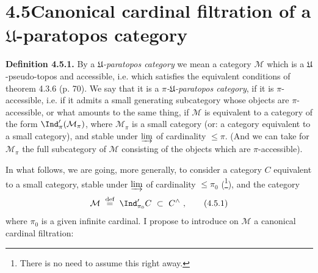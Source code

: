 \setcounter{footnote}{29}


\section*{4.5\quad Canonical cardinal filtration of a $\mathfrak{U}$-paratopos category}

\textbf{Definition 4.5.1.} By a \textit{$\mathfrak{U}$-paratopos category} we mean a category $\mathcal{M}$ which is a $\mathfrak{U}$-pseudo-topos and accessible, i.e. which satisfies the equivalent conditions of theorem 4.3.6 (p. 70). We say that it is a \textit{$\pi$-$\mathfrak{U}$-paratopos category}, if it is $\pi$-accessible, i.e. if it admits a small generating subcategory whose objects are $\pi$-accessible, or what amounts to the same thing, if %
$\mathcal{M}$ is equivalent to a category of the form $\Ind'_{\pi}(\mathcal{M}_{\pi})$, where $\mathcal{M}_{\pi}$ is a small category (or: a category equivalent to a small category), and stable under $\varinjlim$ of cardinality $\leqslant \pi$. (And we can take for $\mathcal{M}_{\pi}$ the full subcategory of $\mathcal{M}$ consisting of the objects
which are $\pi$-accessible).

In what follows, we are going, more generally, to consider a category $C$ equivalent to a small category, stable under $\varinjlim$ of cardinality $\leqslant \pi_0$ (\footnote{There is no need to assume this right away.}), and the category
\[
\mathcal{M} \ \overset{\text{def}}{=}\ \Ind'_{\pi_0}C \ \subset\ C^{\wedge}\ ,
\tag*{(4.5.1)}
\]
where $\pi_0$ is a given infinite cardinal. I propose to introduce on $\mathcal{M}$ a canonical cardinal filtration:


